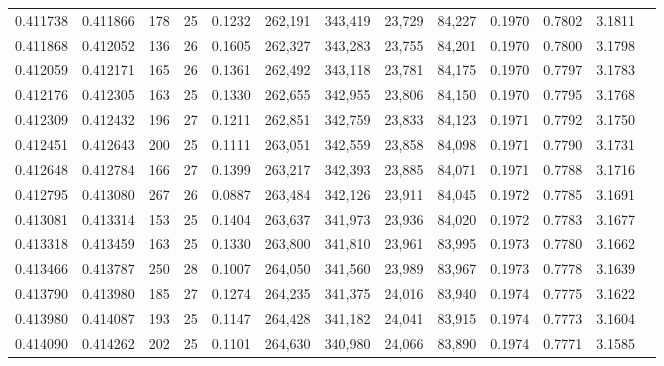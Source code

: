 \begin{tabular}{rrrrrrrrrrrrr}
0.411738 & 0.411866 &   178 &  25 &                                     0.1232 & 262,191 & 343,419 &  23,729 &  84,227 & 0.1970 & 0.7802 & 3.1811 \\
0.411868 & 0.412052 &   136 &  26 &                                     0.1605 & 262,327 & 343,283 &  23,755 &  84,201 & 0.1970 & 0.7800 & 3.1798 \\
0.412059 & 0.412171 &   165 &  26 &                                     0.1361 & 262,492 & 343,118 &  23,781 &  84,175 & 0.1970 & 0.7797 & 3.1783 \\
0.412176 & 0.412305 &   163 &  25 &                                     0.1330 & 262,655 & 342,955 &  23,806 &  84,150 & 0.1970 & 0.7795 & 3.1768 \\
0.412309 & 0.412432 &   196 &  27 &                                     0.1211 & 262,851 & 342,759 &  23,833 &  84,123 & 0.1971 & 0.7792 & 3.1750 \\
0.412451 & 0.412643 &   200 &  25 &                                     0.1111 & 263,051 & 342,559 &  23,858 &  84,098 & 0.1971 & 0.7790 & 3.1731 \\
0.412648 & 0.412784 &   166 &  27 &                                     0.1399 & 263,217 & 342,393 &  23,885 &  84,071 & 0.1971 & 0.7788 & 3.1716 \\
0.412795 & 0.413080 &   267 &  26 &                                     0.0887 & 263,484 & 342,126 &  23,911 &  84,045 & 0.1972 & 0.7785 & 3.1691 \\
0.413081 & 0.413314 &   153 &  25 &                                     0.1404 & 263,637 & 341,973 &  23,936 &  84,020 & 0.1972 & 0.7783 & 3.1677 \\
0.413318 & 0.413459 &   163 &  25 &                                     0.1330 & 263,800 & 341,810 &  23,961 &  83,995 & 0.1973 & 0.7780 & 3.1662 \\
0.413466 & 0.413787 &   250 &  28 &                                     0.1007 & 264,050 & 341,560 &  23,989 &  83,967 & 0.1973 & 0.7778 & 3.1639 \\
0.413790 & 0.413980 &   185 &  27 &                                     0.1274 & 264,235 & 341,375 &  24,016 &  83,940 & 0.1974 & 0.7775 & 3.1622 \\
0.413980 & 0.414087 &   193 &  25 &                                     0.1147 & 264,428 & 341,182 &  24,041 &  83,915 & 0.1974 & 0.7773 & 3.1604 \\
0.414090 & 0.414262 &   202 &  25 &                                     0.1101 & 264,630 & 340,980 &  24,066 &  83,890 & 0.1974 & 0.7771 & 3.1585 \\

\end{tabular}
